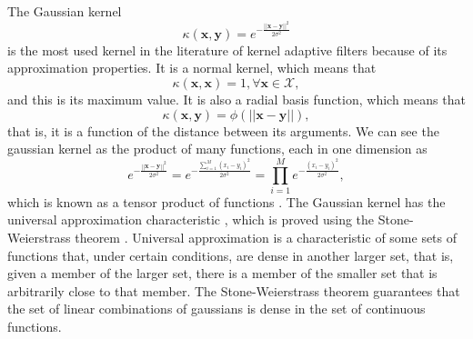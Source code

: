 The Gaussian kernel 
\begin{equation}
    \kappa(\mathbf{x},\mathbf{y}) = e^{-\frac{||\mathbf{x} - \mathbf{y}||^2}{2\sigma^2}}
\end{equation}
is the most used kernel in the literature of kernel adaptive filters \cite{principe_kernel_2010} because of its approximation properties. It is a normal kernel, which means that 
\begin{equation*}
  \kappa(\mathbf{x},\mathbf{x}) = 1, \forall \mathbf{x} \in \mathcal{X},  
\end{equation*}
and this is its maximum value. It is also a radial basis function, which means that
\begin{equation*}
    \kappa(\mathbf{x},\mathbf{y}) = \phi(||\mathbf{x} - \mathbf{y}||),
\end{equation*}
that is, it is a function of the distance between its arguments. 
We can see the gaussian kernel as the product of many functions, each in one dimension as
\begin{equation}
    e^{-\frac{||\mathbf{x} - \mathbf{y}||^2}{2\sigma^2}} = e^{-\frac{\sum_{i=1}^{M}(x_i-y_i)^2}{2\sigma^2}} = \prod_{i=1}^{M}e^{-\frac{(x_i-y_i)^2}{2\sigma^2}},
\end{equation}
which is known as a tensor product of functions \cite{boor_box_1993}.
The Gaussian kernel has the universal approximation characteristic \cite{steinwart_influence_2002}, which is proved using the Stone-Weierstrass theorem \cite{rudin_functional_2007}. 
Universal approximation is a characteristic of some sets of functions that, under certain conditions, are dense in another larger set, that is, given a member of the larger set, there is a member of the smaller set that is arbitrarily close to that member. The Stone-Weierstrass theorem guarantees that the set of linear combinations of gaussians is dense in the set of continuous functions.


